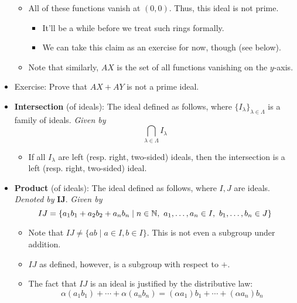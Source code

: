 \documentclass[../notes.tex]{subfiles}
\begin{document}
\begin{itemize}
\begin{itemize}
\begin{equation*}
        \end{equation*}
        \item All of these functions vanish at $(0,0)$. Thus, this ideal is not prime.
        \begin{itemize}
            \item It'll be a while before we treat such rings formally.
            \item We can take this claim as an exercise for now, though (see below).
        \end{itemize}
        \item Note that similarly, $AX$ is the set of all functions vanishing on the $y$-axis.
    \end{itemize}
    \item Exercise: Prove that $AX+AY$ is not a prime ideal.
    \item \textbf{Intersection} (of ideals): The ideal defined as follows, where $\{I_\lambda\}_{\lambda\in\Lambda}$ is a family of ideals. \emph{Given by}
    \begin{equation*}
        \bigcap_{\lambda\in\Lambda}I_\lambda
    \end{equation*}
    \begin{itemize}
        \item If all $I_\lambda$ are left (resp. right, two-sided) ideals, then the intersection is a left (resp. right, two-sided) ideal.
    \end{itemize}
    \item \textbf{Product} (of ideals): The ideal defined as follows, where $I,J$ are ideals. \emph{Denoted by} $\bm{IJ}$. \emph{Given by}
    \begin{equation*}
        IJ = \{a_1b_1+a_2b_2+a_nb_n\mid n\in\N,\ a_1,\dots,a_n\in I,\ b_1,\dots,b_n\in J\}
    \end{equation*}
    \begin{itemize}
        \item Note that $IJ\neq\{ab\mid a\in I,b\in I\}$. This is not even a subgroup under addition.
        \item $IJ$ as defined, however, is a subgroup with respect to $+$.
        \item The fact that $IJ$ is an ideal is justified by the distributive law:
        \begin{equation*}
            \alpha(a_1b_1)+\cdots+\alpha(a_nb_n) = (\alpha a_1)b_1+\cdots+(\alpha a_n)b_n
        \end{equation*}
        \begin{itemize}

\end{itemize}
\end{itemize}
\end{itemize}
\end{document}

